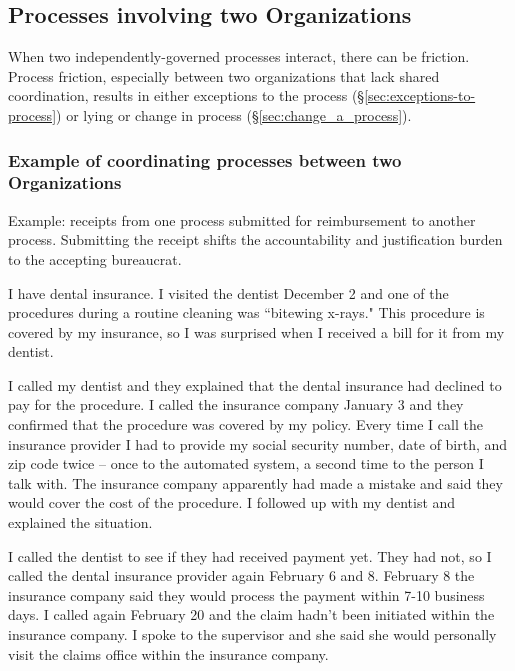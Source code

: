 \subsection{Processes involving two Organizations}

When two independently-governed processes interact, there can be friction. Process friction, especially between two  organizations that lack shared coordination, results in either exceptions to the process (\S\ref{sec:exceptions-to-process}) or lying or change in process (\S\ref{sec:change_a_process}). 

\subsubsection{Example of coordinating processes between two Organizations}
Example: receipts from one process submitted for reimbursement to another process.
Submitting the receipt shifts the accountability and justification burden to the accepting bureaucrat.




I have dental insurance. I visited the dentist December 2 and one of the procedures during a routine cleaning was ``bitewing x-rays." This procedure is covered by my insurance, so I was surprised when I received a bill for it from my dentist.

I called my dentist and they explained that the dental insurance had declined to pay for the procedure. I called the insurance company January 3 and they confirmed that the procedure was covered by my policy. 
Every time I call the insurance provider I had to provide my social security number, date of birth, and zip code twice -- once to the automated system, a second time to the person I talk with. The insurance company apparently had made a mistake and said they would cover the cost of the procedure. I followed up with my dentist and explained the situation.

I called the dentist to see if they had received payment yet. They had not, so I called the dental insurance provider again February 6 and 8. February 8 the insurance company said they would process the payment within 7-10 business days. I called again February 20 and the claim hadn't been initiated within the insurance company. I spoke to the supervisor and she said she would personally visit the claims office within the insurance company.

